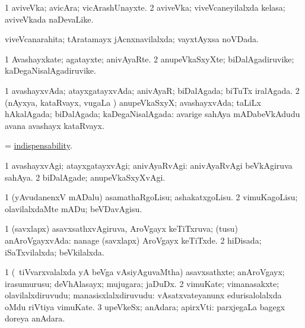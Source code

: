 \bentry
{}
\gl{\nA}
\bmng
\bnum
\num{1} aviveVka; avicAra; vicArashUnayxte. 
\num{2} aviveVka; viveVcaneyilalxda kelasa; aviveVkada naDevaLike. 
\enum
\emng
\eentry

\bentry
{}
\gl{\gu}
\bmng
viveVcanarahita; tAratamayx jAcnxnavilalxda; vayxtAyxsa noVDada. 
\emng
\eentry

\bentry
{}
\gl{\nA}
\bmng
\bnum
\num{1} Avashayxkate; agatayxte; anivAyaRte. 
\num{2} anupeVkaSxyXte; biDalAgadiruvike; kaDegaNisalAgadiruvike. 
\enum
\emng
\eentry

\bentry
{}
\gl{\gu}
\bmng
\bnum
\num{1} avashayxvAda; atayxgatayxvAda; anivAyaR; biDalAgada; biTuTx iralAgada. 
\num{2} (nAyxya, kataRvayx, \mo vugaLa \vi) anupeVkaSxyX; avashayxvAda; taLiLx hAkalAgada; biDalAgada; kaDegaNisalAgada:  avarige sahAya mADabeVkAdudu avana avashayx kataRvayx. 
\enum
\emng
\eentry

\bentry
{}
\gl{\nA}
\bmng
 = \hyperlink{indispensability}{indispensability}. 
\emng
\eentry

\bentry
{}
\gl{\kirxvi}
\bmng
\bnum
\num{1} avashayxvAgi; atayxgatayxvAgi; anivAyaRvAgi:  anivAyaRvAgi beVkAgiruva sahAya. 
\num{2} biDalAgade; anupeVkaSxyXvAgi. 
\enum
\emng
\eentry

\bentry
{}
\gl{\sakirx}
\bmng
\bnum
\num{1} (yAvudanenxV mADalu) asamathaRgoLisu; ashakatxgoLisu. 
\num{2} vimuKagoLisu; olavilalxdaMte mADu; beVDavAgisu. 
\enum
\emng
\eentry

\bentry
{}
\gl{\gu}
\bmng
\bnum
\num{1} (savxlapx) asavxsathxvAgiruva, AroVgayx keTiTxruva; (tusu) anAroVgayxvAda:  nanage (savxlapx) AroVgayx keTiTxde. 
\num{2} hiDisada; iSaTxvilalxda; beVkilalxda. 
\enum
\emng
\eentry

\bentry
{}
\gl{\nA}
\bmng
\bnum
\num{1} (\kanmu\ tiVvarxvalalxda yA beVga vAsiyAguvaMtha) asavxsathxte; anAroVgayx; irasumurusu; deVhAlasayx; mujugara; jaDuDx. 
\num{2} vimuKate; vimanasakxte; olavilalxdiruvudu; manasisxlalxdiruvudu:  vAsatxvateyanunx edurisalolalxda oMdu riVtiya vimuKate. 
\num{3} upeVkeSx; anAdara; apirxVti:  parxjegaLa bagegx doreya anAdara. 
\enum
\emng
\eentry

